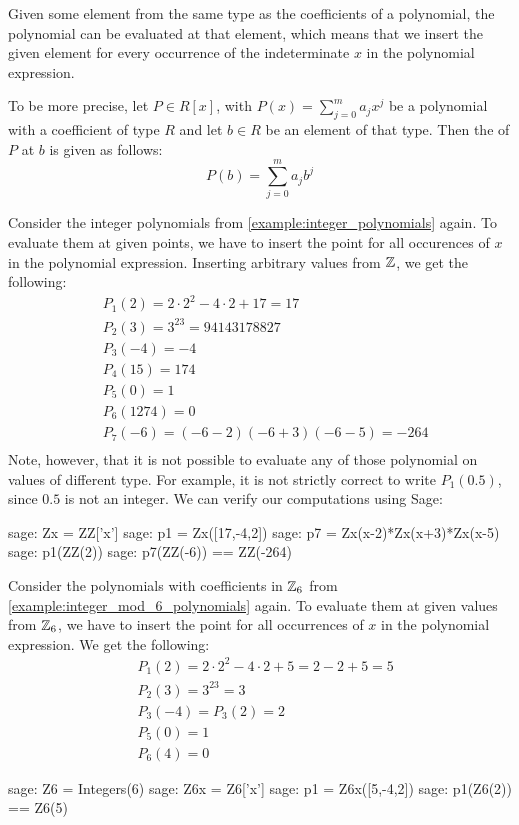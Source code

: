 Given some element from the same type as the coefficients of a polynomial, the polynomial can be evaluated at that element, which means that we insert the given element for every occurrence of the indeterminate $x$ in the polynomial expression.

To be more precise, let $P\in R[x]$, with $P(x)=\sum_{j=0}^m a_j x^j$ be a polynomial with a coefficient of type $R$ and let $b\in R$ be an element of that type. Then the  of $P$ at $b$ is given as follows:
\begin{equation}
P(b) = \sum_{j=0}^m a_j b^j
\end{equation}
\begin{example}Consider the integer polynomials from \examplename{} \ref{example:integer_polynomials} again. To evaluate them at given points, we have to insert the point for all occurences of $x$ in the polynomial expression. Inserting arbitrary values from $\mathbb{Z}$, we get the following:
\begin{align*}
 &P_1(2)    = 2\cdot 2^2 -4\cdot 2 +17 = 17 \\
 &P_2(3)    = 3^{23}=94143178827 \\
 &P_3(-4)   = -4 \\
 &P_4(15)   = 174 \\
 &P_5(0)    = 1 \\
 &P_6(1274) =0 \\
 &P_7(-6)   = (-6-2)(-6+3)(-6-5) = -264 \\
\end{align*}
Note, however, that it is not possible to evaluate any of those polynomial on values of different type. For example, it is not strictly correct to write $P_1(0.5)$, since $0.5$ is not an integer. We can verify our computations using  Sage:
\begin{sagecommandline}
sage: Zx = ZZ['x']
sage: p1 = Zx([17,-4,2])
sage: p7 = Zx(x-2)*Zx(x+3)*Zx(x-5)
sage: p1(ZZ(2))
sage: p7(ZZ(-6)) == ZZ(-264)
\end{sagecommandline}

\end{example}
\begin{example} Consider the polynomials with coefficients in $\mathbb{Z}_6$ from \examplename{} \ref{example:integer_mod_6_polynomials} again. To evaluate them at given values from $\mathbb{Z}_6$, we have to insert the point for all occurrences of $x$ in the polynomial expression. We get the following:
\begin{align*}
 & P_1(2)= 2\cdot 2^2 -4\cdot 2 +5 = 2 - 2 + 5 = 5\\
 &P_2(3)= 3^{23}=3\\
 &P_3(-4)= P_3(2) = 2\\
 &P_5(0)= 1\\
 &P_6(4)=0
\end{align*}
\begin{sagecommandline}
sage: Z6 = Integers(6)
sage: Z6x = Z6['x']
sage: p1 = Z6x([5,-4,2])
sage: p1(Z6(2)) == Z6(5)
\end{sagecommandline}

\end{example}
